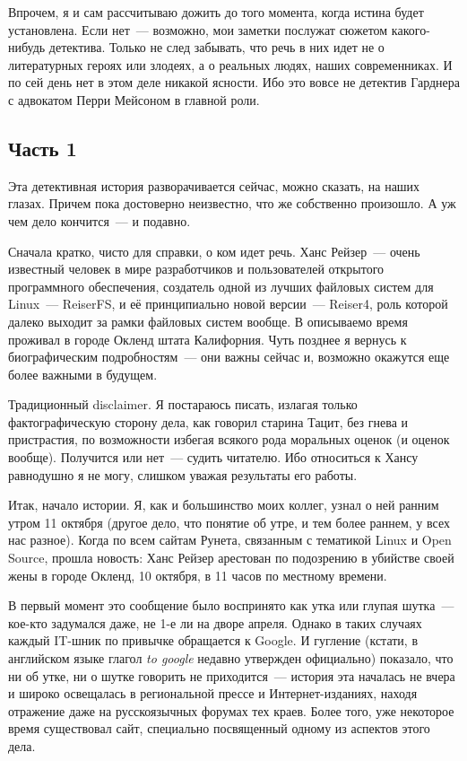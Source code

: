 Впрочем, я и сам рассчитываю дожить до того момента, когда истина будет установлена. Если нет~--- возможно, мои заметки послужат сюжетом какого-нибудь детектива. Только не след забывать, что речь в них идет не о литературных героях или злодеях, а о реальных людях, наших современниках.  И по сей день нет в этом деле никакой ясности. Ибо это вовсе не детектив Гарднера с адвокатом Перри Мейсоном в главной роли. 

\subsection{Часть 1}

Эта детективная история разворачивается сейчас, можно сказать, на наших глазах. Причем пока достоверно неизвестно, что же собственно произошло. А уж чем дело кончится~--- и подавно. 

Сначала кратко, чисто для справки, о ком идет речь. Ханс Рейзер~--- очень известный человек в мире разработчиков и пользователей открытого программного обеспечения, создатель одной из лучших файловых систем для Linux~--- ReiserFS, и её принципиально новой версии~--- Reiser4, роль которой далеко выходит за рамки файловых систем вообще. В описываемо время проживал в городе Окленд штата Калифорния. Чуть позднее я вернусь к биографическим подробностям~--- они важны сейчас и, возможно окажутся еще более важными в будущем. 

Традиционный disclaimer. Я постараюсь писать, излагая только фактографическую сторону дела, как говорил старина Тацит, без гнева и пристрастия, по возможности избегая всякого рода моральных оценок (и оценок вообще). Получится или нет~--- судить читателю. Ибо относиться к Хансу равнодушно я не могу, слишком уважая результаты его работы. 

Итак, начало истории. Я, как и большинство моих коллег, узнал о ней ранним утром 11 октября (другое дело, что понятие об утре, и тем более раннем, у всех нас разное). Когда по всем сайтам Рунета, связанным с тематикой Linux и Open Source, прошла новость: Ханс Рейзер арестован по подозрению в убийстве своей жены в городе Окленд, 10 октября, в 11 часов по местному времени. 

В первый момент это сообщение было воспринято как утка или глупая шутка~--- кое-кто задумался даже, не 1-е ли на дворе апреля. Однако в таких случаях каждый IT-шник по привычке обращается к Google. И гугление (кстати, в английском языке глагол \textit{to google} недавно утвержден официально) показало, что ни об утке, ни о шутке говорить не приходится~--- история эта началась не вчера и широко освещалась в региональной прессе и Интернет-изданиях, находя отражение даже на русскоязычных форумах тех краев. Более того, уже некоторое время существовал сайт, специально посвященный одному из аспектов этого дела. 

